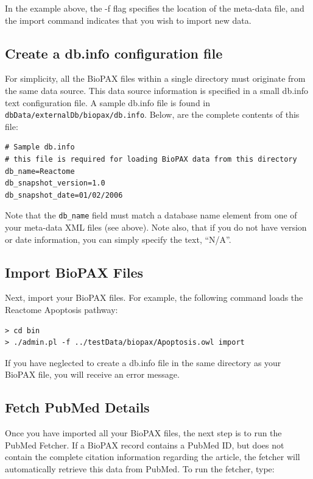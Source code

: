 \documentclass[letterpaper,12pt]{article}
\begin{document}
In the example above, the -f flag specifies the location of the meta-data file, and the import command indicates that you wish to import new data.

\subsection{Create a db.info configuration file}

For simplicity, all the BioPAX files within a single directory must originate from the same data source.  This data source information is specified in a small db.info text configuration file.  A sample db.info file is found in \verb+dbData/externalDb/biopax/db.info+.  Below, are the complete contents of this file:

\begin{verbatim}
# Sample db.info
# this file is required for loading BioPAX data from this directory
db_name=Reactome
db_snapshot_version=1.0
db_snapshot_date=01/02/2006
\end{verbatim}

Note that the \verb+db_name+ field must match a database name element from one of your meta-data XML files (see above).  Note also, that if you do not have version or date information, you can simply specify the text, ``N/A''.

\subsection{Import BioPAX Files}

Next, import your BioPAX files.  For example, the following command loads the Reactome Apoptosis pathway:

\begin{verbatim}
> cd bin
> ./admin.pl -f ../testData/biopax/Apoptosis.owl import
\end{verbatim}

If you have neglected to create a db.info file in the same directory as your BioPAX file, you will receive an error message.

\subsection{Fetch PubMed Details}

Once you have imported all your BioPAX files, the next step is to run the PubMed Fetcher.  If a BioPAX record contains a PubMed ID, but does not contain the complete citation information regarding the article, the fetcher will automatically retrieve this data from PubMed.  To run the fetcher, type:
\end{document}
